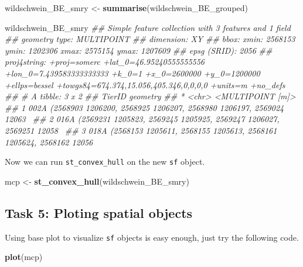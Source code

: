 \documentclass[]{book}
\newenvironment{Shaded}{\begin{snugshade}}{\end{snugshade}}
\newcommand{\CommentTok}[1]{\textcolor[rgb]{0.56,0.35,0.01}{\textit{#1}}}
\newcommand{\KeywordTok}[1]{\textcolor[rgb]{0.13,0.29,0.53}{\textbf{#1}}}
\newcommand{\NormalTok}[1]{#1}
\newcommand{\StringTok}[1]{\textcolor[rgb]{0.31,0.60,0.02}{#1}}
\begin{document}
\begin{Shaded}
\begin{Highlighting}[]
\NormalTok{wildschwein_BE_smry <-}\StringTok{ }\KeywordTok{summarise}\NormalTok{(wildschwein_BE_grouped)}

\NormalTok{wildschwein_BE_smry}
\CommentTok{## Simple feature collection with 3 features and 1 field}
\CommentTok{## geometry type:  MULTIPOINT}
\CommentTok{## dimension:      XY}
\CommentTok{## bbox:           xmin: 2568153 ymin: 1202306 xmax: 2575154 ymax: 1207609}
\CommentTok{## epsg (SRID):    2056}
\CommentTok{## proj4string:    +proj=somerc +lat_0=46.95240555555556 +lon_0=7.439583333333333 +k_0=1 +x_0=2600000 +y_0=1200000 +ellps=bessel +towgs84=674.374,15.056,405.346,0,0,0,0 +units=m +no_defs}
\CommentTok{## # A tibble: 3 x 2}
\CommentTok{##   TierID                                                           geometry}
\CommentTok{## * <chr>                                                    <MULTIPOINT [m]>}
\CommentTok{## 1 002A   (2568903 1206200, 2568925 1206207, 2568980 1206197, 2569024 12063~}
\CommentTok{## 2 016A   (2569231 1205823, 2569245 1205925, 2569247 1206027, 2569251 12058~}
\CommentTok{## 3 018A   (2568153 1205611, 2568155 1205613, 2568161 1205624, 2568162 12056~}
\end{Highlighting}
\end{Shaded}

Now we can run \texttt{st\_convex\_hull} on the new \texttt{sf} object.

\begin{Shaded}
\begin{Highlighting}[]
\NormalTok{mcp <-}\StringTok{ }\KeywordTok{st_convex_hull}\NormalTok{(wildschwein_BE_smry)}
\end{Highlighting}
\end{Shaded}

\hypertarget{task-5-ploting-spatial-objects}{%
\subsection{Task 5: Ploting spatial objects}\label{task-5-ploting-spatial-objects}}

Using base plot to visualize \texttt{sf} objects is easy enough, just try the following code.

\begin{Shaded}
\begin{Highlighting}[]
\KeywordTok{plot}\NormalTok{(mcp)}
\end{Highlighting}
\end{Shaded}
\end{document}
